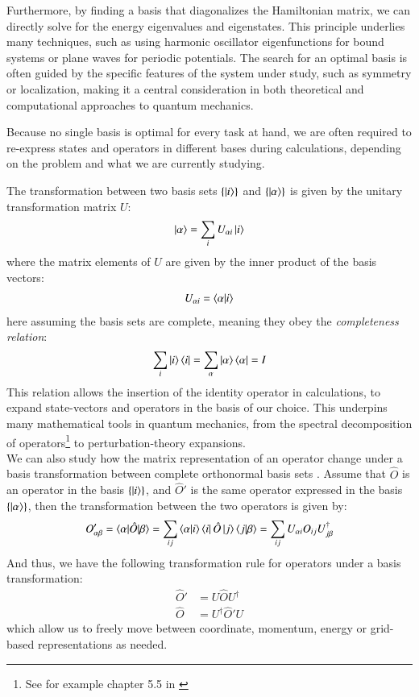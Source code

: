 \documentclass{subfiles}
\begin{document}
Furthermore, by finding a basis that diagonalizes the Hamiltonian matrix, we can directly solve for the energy eigenvalues and eigenstates. This principle underlies many techniques, such as using harmonic oscillator eigenfunctions for bound systems or plane waves for periodic potentials\cite{griffiths2018introduction, kittel2018introduction}. The search for an optimal basis is often guided by the specific features of the system under study, such as symmetry or localization, making it a central consideration in both theoretical and computational approaches to quantum mechanics. 

Because no single basis is optimal for every task at hand, we are often required to re-express states and operators in different bases during calculations, depending on the problem and what we are currently studying. 

The transformation between two basis sets $\{\ket{i}\}$ and $\{\ket{\alpha}\}$ is given by the unitary transformation matrix $U$:
\begin{align*}
    \ket{\alpha} = \sum_i U_{\alpha i}\ket{i}
\end{align*}
where the matrix elements of $U$ are given by the inner product of the basis vectors:
\begin{align*}
    U_{\alpha i} = \braket{\alpha|i}
\end{align*}
here assuming the basis sets are complete, meaning they obey the \emph{completeness relation}:
\begin{align*}
    \sum_i \ket{i}\bra{i} = \sum_\alpha \ket{\alpha}\bra{\alpha} = I
\end{align*}
This relation allows the insertion of the identity operator in calculations, to expand state-vectors and operators in the basis of our choice. This underpins many mathematical tools in quantum mechanics, from the spectral decomposition of operators\footnote{See for example chapter 5.5 in \cite{strang2000linear}} to perturbation-theory expansions\cite{griffiths2018introduction, berera2021quantum, sakurai1986modern}. \\


We can also study how the matrix representation of an operator change under a basis transformation between complete orthonormal basis sets \cite{szabo1996modern}.
Assume that $\hat O$ is an operator in the basis $\{\ket{i}\}$, and $\hat O'$ is the same operator expressed in the basis $\{\ket{\alpha}\}$, then the transformation between the two operators is given by:
\begin{align*}
    O'_{\alpha\beta} = \braket{\alpha|\hat O|\beta} = \sum_{ij}\braket{\alpha|i}\bra{i}\hat O\ket{j}\braket{j|\beta} = \sum_{ij}U_{\alpha i}O_{ij}U^\dagger_{j\beta}
\end{align*}
And thus, we have the following transformation rule for operators under a basis transformation:
\begin{align*}
    \hat O' &= U\hat OU^\dagger \\
    \hat O &= U^\dagger\hat O'U
\end{align*}
which allow us to freely move between coordinate, momentum, energy or grid-based representations as needed.
\end{document}
